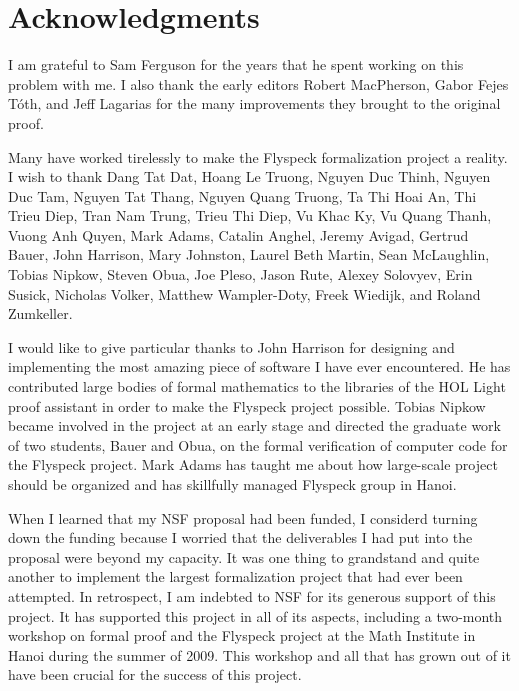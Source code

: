 

\section*{Acknowledgments}


I am grateful to Sam Ferguson for the years that he spent working on
this problem with me.  I also thank the early editors Robert
MacPherson, Gabor Fejes T\'oth, and Jeff Lagarias for the many
improvements they brought to the original proof.

Many have worked tirelessly to make the Flyspeck formalization project
a reality.  I wish to thank 
Dang Tat Dat, 
Hoang Le Truong,
Nguyen Duc Thinh,  
Nguyen Duc Tam, 
Nguyen Tat Thang,
Nguyen Quang Truong, 
Ta Thi Hoai An, 
Thi Trieu Diep,
Tran Nam Trung, 
Trieu Thi Diep, 
Vu Khac Ky, 
Vu Quang Thanh,
Vuong Anh Quyen,
% 
Mark Adams,
Catalin Anghel, 
Jeremy Avigad, 
Gertrud Bauer, 
%
John Harrison, 
Mary Johnston, 
Laurel Beth Martin, 
Sean McLaughlin, 
Tobias Nipkow, 
Steven Obua, 
Joe Pleso, 
%
Jason Rute,
Alexey Solovyev,
Erin Susick,
Nicholas Volker, 
Matthew Wampler-Doty, 
 Freek Wiedijk, 
and Roland Zumkeller.

I would like to give particular thanks 
to John Harrison for designing and implementing the
most amazing piece of software I have ever encountered.  He has
contributed large bodies of formal mathematics to the libraries of the
HOL Light proof assistant in order to make the Flyspeck project
possible.  Tobias Nipkow became involved in the project at an early
stage and directed the graduate work of two students, Bauer and Obua,
on the formal verification of computer code for the Flyspeck
project. Mark Adams has taught me about how large-scale project should
be organized and has skillfully managed Flyspeck group in Hanoi.

When I learned that my NSF proposal had been funded, I considerd
turning down the funding because I worried that the deliverables I had
put into the proposal were beyond my capacity.  It was one thing to
grandstand and quite another to implement the largest formalization
project that had ever been attempted.  In retrospect, I am indebted to
NSF for its generous support of this project.  It has supported this
project in all of its aspects, including a two-month workshop on
formal proof and the Flyspeck project at the Math Institute in Hanoi
during the summer of 2009.  This workshop and all that has grown out
of it have been crucial for the success of this project.

